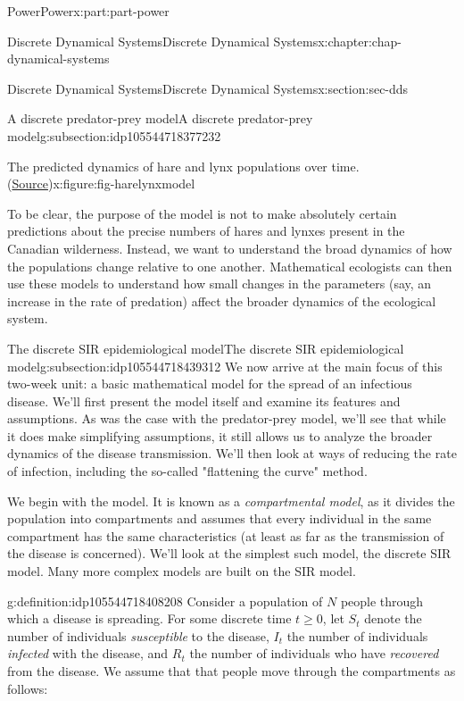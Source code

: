 \documentclass[oneside,10pt,]{book}
\numberwithin{equation}{section}
\renewcommand{\ge}{\geqslant}
\begin{document}
\begin{partptx}{Power}{}{Power}{}{}{x:part:part-power}
\begin{chapterptx}{Discrete Dynamical Systems}{}{Discrete Dynamical Systems}{}{}{x:chapter:chap-dynamical-systems}
\begin{sectionptx}{Discrete Dynamical Systems}{}{Discrete Dynamical Systems}{}{}{x:section:sec-dds}
\begin{subsectionptx}{A discrete predator-prey model}{}{A discrete predator-prey model}{}{}{g:subsection:idp105544718377232}
\begin{figureptx}{The predicted dynamics of hare and lynx populations over time. (\href{https://www.cds.caltech.edu/\~murray/amwiki/index.php/Predator_prey}{Source}\protect\footnotemark{})}{x:figure:fig-harelynxmodel}{}
\begin{image}{0.25}{0.5}{0.25}
\end{image}%
\tcblower
\end{figureptx}%
%
To be clear, the purpose of the model is not to make absolutely certain predictions about the precise numbers of hares and lynxes present in the Canadian wilderness. Instead, we want to understand the broad dynamics of how the populations change relative to one another. Mathematical ecologists can then use these models to understand how small changes in the parameters (say, an increase in the rate of predation) affect the broader dynamics of the ecological system.%
\end{subsectionptx}
%
%
\typeout{************************************************}
\typeout{************************************************}
%
\begin{subsectionptx}{The discrete SIR epidemiological model}{}{The discrete SIR epidemiological model}{}{}{g:subsection:idp105544718439312}
We now arrive at the main focus of this two-week unit: a basic mathematical model for the spread of an infectious disease. We'll first present the model itself and examine its features and assumptions. As was the case with the predator-prey model, we'll see that while it does make simplifying assumptions, it still allows us to analyze the broader dynamics of the disease transmission. We'll then look at ways of reducing the rate of infection, including the so-called "flattening the curve" method.%
\par
We begin with the model. It is known as a \emph{compartmental model}, as it divides the population into compartments and assumes that every individual in the same compartment has the same characteristics (at least as far as the transmission of the disease is concerned). We'll look at the simplest such model, the discrete SIR model. Many more complex models are built on the SIR model.%
\begin{definition}{}{g:definition:idp105544718408208}%
Consider a population of \(N\) people through which a disease is spreading. For some discrete time \(t \ge 0\), let \(S_t\) denote the number of individuals \emph{susceptible} to the disease, \(I_t\) the number of individuals \emph{infected} with the disease, and \(R_t\) the number of individuals who have \emph{recovered} from the disease. We assume that that people move through the compartments as follows:%
%
\begin{equation}

\end{equation}
\end{definition}
\end{subsectionptx}
\end{sectionptx}
\end{chapterptx}
\end{partptx}
\end{document}
